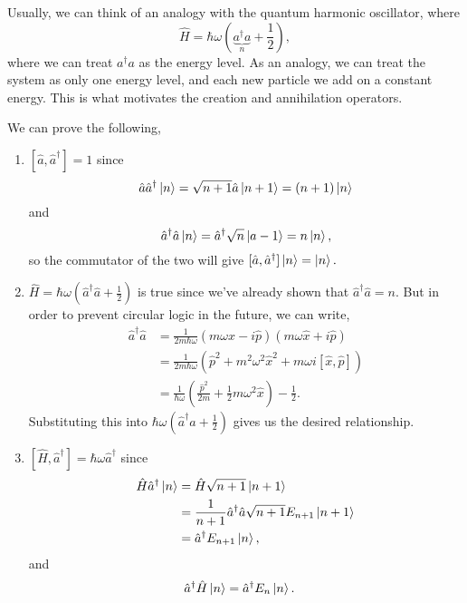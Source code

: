 \documentclass{article}
\numberwithin{equation}{section}
\begin{document}
Usually, we can think of an analogy with the quantum harmonic oscillator, where 
\begin{equation}
    \hat{H} = \hbar\omega\left(\underbrace{a^\dagger a}_{n} + \frac{1}{2}\right),
\end{equation}
where we can treat $a^\dagger a$ as the energy level. As an analogy, we can treat the system as only one energy level, and each new particle we add on a constant energy. This is what motivates the creation and annihilation operators.
\begin{problem}[3.3.1]
    We can prove the following,
    \begin{enumerate}[label=(\alph*)]
        \item $[\hat{a},\hat{a}^\dagger] = 1$ since $$\hat{a}\hat{a}^\dagger \ket{n} = \sqrt{n+1}\hat{a}\ket{n+1} = (n+1)\ket{n}$$ and 
        $$\hat{a}^\dagger \hat{a}\ket{n} = \hat{a}^\dagger\sqrt{n}\ket{a-1} = n\ket{n},$$ so the commutator of the two will give $[\hat{a},\hat{a}^\dagger]\ket{n} = \ket{n}.$
        \item $\hat{H} = \hbar\omega\left(\hat{a}^\dagger\hat{a} + \frac{1}{2}\right)$ is true since we've already shown that $\hat{a}^\dagger\hat{a} = n.$ But in order to prevent circular logic in the future, we can write,
        \begin{align}
            \hat{a}^\dagger\hat{a} &= \frac{1}{2m\hbar\omega}\left(m\omega \hat{x}-i\hat{p}\right)\left(m\omega \hat{x}+i\hat{p}\right) \\ 
            &= \frac{1}{2m\hbar\omega}\left(\hat{p}^2 + m^2\omega^2\hat{x}^2 + m\omega i [\hat{x},\hat{p}]\right) \\
            &= \frac{1}{\hbar\omega}\left(\frac{\hat{p}^2}{2m} + \frac{1}{2}m\omega^2\hat{x}\right) - \frac{1}{2}.
        \end{align}
        Substituting this into $\hbar\omega(\hat{a}^\dagger\hat{a} + \frac{1}{2})$ gives us the desired relationship.
        \item $[\hat{H},\hat{a}^\dagger]=\hbar\omega\hat{a}^\dagger$ since
        \begin{align}
            \hat{H}\hat{a}^\dagger \ket{n} &= \hat{H}\sqrt{n+1}\ket{n+1}\\ 
            &= \frac{1}{n+1}\hat{a}^\dagger \hat{a}\sqrt{n+1}E_{n+1}\ket{n+1} \\ 
            &= \hat{a}^\dagger E_{n+1}\ket{n},
        \end{align}
        and 
        \begin{align}
            \hat{a}^\dagger \hat{H}\ket{n} &= \hat{a}^\dagger E_n \ket{n}.

\end{align}
\end{enumerate}
\end{problem}
\end{document}
